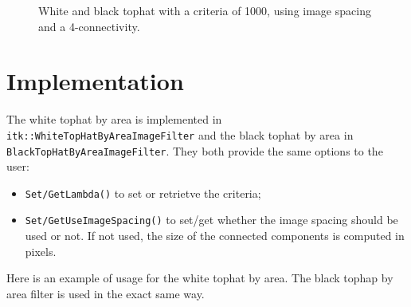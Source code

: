 \documentclass{InsightArticle}
\begin{document}
\begin{figure}[htbp]
\begin{center}
\caption{White and black tophat with a criteria of 1000, using image spacing and a 4-connectivity.}
\end{center}
\end{figure}

\section{Implementation}

The white tophat by area is implemented in \verb$itk::WhiteTopHatByAreaImageFilter$ and the black tophat by area in \verb$BlackTopHatByAreaImageFilter$.
They both provide the same options to the user:
\begin{itemize}
 \item \verb$Set/GetLambda()$ to set or retrietve the criteria;
 \item \verb$Set/GetUseImageSpacing()$ to set/get whether the image spacing should be used or not. If not used, the size of the connected components is
computed in pixels.
\end{itemize}

Here is an example of usage for the white tophat by area. The black tophap by area filter is used in the exact same way.
\end{document}
